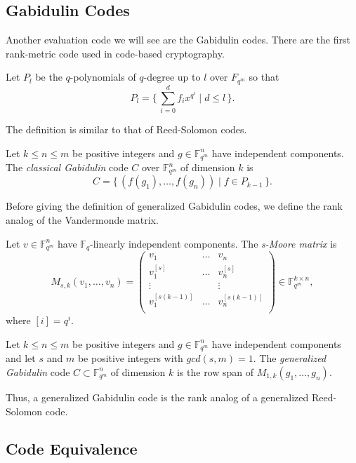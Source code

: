 \subsection{Gabidulin Codes}
Another evaluation code we will see are the Gabidulin codes. There are the first rank-metric code used in code-based cryptography.

Let $P_l$ be the $q$-polynomials of $q$-degree up to $l$ over $F_{q^m}$ so that
\[
P_l = \{\, \sum_{i=0}^df_ix^{q^i} \mid d \leq l \,\}.
\]

The definition is similar to that of Reed-Solomon codes.

\begin{definition}
Let $k \leq n \leq m$ be positive integers and $g \in \mathbb{F}_{q^m}^n$ have independent components. The \textit{classical Gabidulin} code $C$ over $\mathbb{F}_{q^m}^n$ of dimension $k$ is
\[
C = 
\{\, (f(g_1), \dots, f(g_n)) \mid f \in P_{k-1} \, \}.
\]
\end{definition}
Before giving the definition of generalized Gabidulin codes, we define the rank analog of the Vandermonde matrix.

\begin{definition}
Let $v \in \mathbb{F}_{q^m}^n$ have $\mathbb{F}_q$-linearly independent components. The \textit{s-Moore matrix} is
\[
M_{s, k}(v_1, \dots, v_n) = 
\begin{pmatrix}
    v_1 &\dots& v_n \\
    v_1^{[s]} &\dots& v_n^{[s]} \\
    \vdots && \vdots \\
    v_1^{[s(k-1)]} &\dots& v_n^{[s(k-1)]} \\
\end{pmatrix} \in \mathbb{F}_{q^m}^{k \times n},
\]
where $[i] = q^i$.
\end{definition}

\begin{definition}
Let $k \leq n \leq m$ be positive integers and $g \in \mathbb{F}_{q^m}^n$ have independent components and let $s$ and $m$  be positive integers with $gcd(s, m) = 1$. The \textit{generalized Gabidulin} code $C \subset \mathbb{F}_{q^m}^n$ of dimension $k$ is the row span of $M_{1, k}(g_1, \dots, g_n)$.    
\end{definition}

Thus, a generalized Gabidulin code is the rank analog of a generalized Reed-Solomon code.

\subsection{Code Equivalence}

